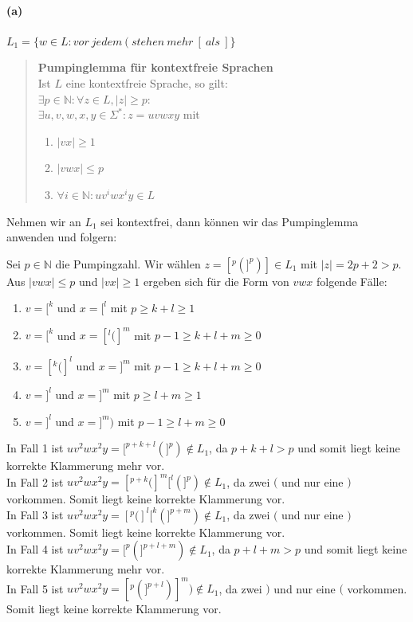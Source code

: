 
\paragraph{(a)}
	$L_1 = \{ w \in L: vor\ jedem\ (\ stehen\ mehr\ [\ als\ ] \}$ 
	
	\begin{quote}
		\textbf{Pumpinglemma für kontextfreie Sprachen} \\
		Ist $L$ eine kontextfreie Sprache, so gilt: \\
		$\exists p \in \mathbb{N}: \forall z \in L, |z| \geq p:$ \\
		$\exists u,v,w,x,y \in \Sigma^*: z = uvwxy$ mit
		\begin{enumerate}
			\item $|vx| \geq 1$
			\item $|vwx| \leq p$
			\item $\forall i \in \mathbb{N} : uv^{i}wx^{i}y \in L$
		\end{enumerate}
	\end{quote}

	Nehmen wir an $L_1$ sei kontextfrei, dann können wir das Pumpinglemma anwenden und folgern:
	
	Sei $p \in \mathbb{N}$ die Pumpingzahl. Wir wählen $z = [^p(]^p)] \in L_1$ mit $|z| = 2p+2 > p$.\\
	Aus $|vwx| \leq p$ und $|vx| \geq 1$ ergeben sich für die Form von $vwx$ folgende Fälle:
	\begin{enumerate}
		\item $v=[^k$ und $x=[^l$ mit $p \geq k+l  \geq 1$
		\item $v=[^k$ und $x=[^l(]^m$ mit $p-1 \geq k+l+m  \geq 0$
		\item $v=[^k(]^l$ und $x=]^m$ mit $p-1 \geq k+l+m  \geq 0$
		\item $v=]^l$ und $x=]^m$ mit $p \geq l+m  \geq 1$
		\item $v=]^l$ und $x=]^m)$ mit $p-1 \geq l+m  \geq 0$
	\end{enumerate}

	In Fall 1 ist $uv^2wx^2y=[^{p+k+l}(]^{p}) \notin L_1$, da $p+k+l > p$ und somit liegt keine korrekte Klammerung mehr vor.\\
	In Fall 2 ist $uv^2wx^2y=[^{p+k}(]^{m}[^{l}(]^{p}) \notin L_1$, da zwei $($ und nur eine $)$ vorkommen. Somit liegt keine korrekte Klammerung vor.\\
	In Fall 3 ist $uv^2wx^2y=[^{p}(]^{l}[^{k}(]^{p+m}) \notin L_1$, da zwei $($ und nur eine $)$ vorkommen. Somit liegt keine korrekte Klammerung vor.\\
	In Fall 4 ist $uv^2wx^2y=[^{p}(]^{p+l+m}) \notin L_1$, da $p+l+m > p$ und somit liegt keine korrekte Klammerung mehr vor.\\
	In Fall 5 ist $uv^2wx^2y=[^{p}(]^{p+l})]^{m}) \notin L_1$, da zwei $)$ und nur eine $($ vorkommen. Somit liegt keine korrekte Klammerung vor.
	
